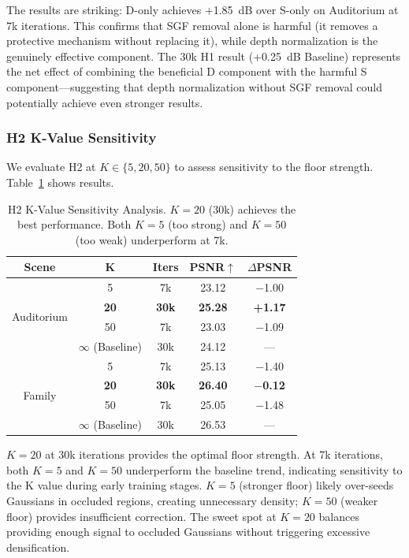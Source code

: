 \documentclass[conference]{IEEEtran}
\begin{document}
The results are striking: D-only achieves +1.85~dB over S-only on Auditorium at 7k iterations. This confirms that SGF removal alone is harmful (it removes a protective mechanism without replacing it), while depth normalization is the genuinely effective component. The 30k H1 result (+0.25~dB Baseline) represents the net effect of combining the beneficial D component with the harmful S component—suggesting that depth normalization without SGF removal could potentially achieve even stronger results.

\subsubsection{H2 K-Value Sensitivity}

We evaluate H2 at $K \in \{5, 20, 50\}$ to assess sensitivity to the floor strength. Table~\ref{tab:k_scan} shows results.

\begin{table}[t]
\centering
\caption{H2 K-Value Sensitivity Analysis. $K=20$ (30k) achieves the best performance. Both $K=5$ (too strong) and $K=50$ (too weak) underperform at 7k.}
\label{tab:k_scan}
\begin{tabular}{ccccc}
\toprule
Scene & K & Iters & PSNR$\uparrow$ & $\Delta$PSNR \\
\midrule
\multirow{4}{*}{Auditorium}
 & 5 & 7k & 23.12 & $-$1.00 \\
 & \textbf{20} & \textbf{30k} & \textbf{25.28} & \textbf{+1.17} \\
 & 50 & 7k & 23.03 & $-$1.09 \\
 & $\infty$ (Baseline) & 30k & 24.12 & — \\
\midrule
\multirow{4}{*}{Family}
 & 5 & 7k & 25.13 & $-$1.40 \\
 & \textbf{20} & \textbf{30k} & \textbf{26.40} & \textbf{$-$0.12} \\
 & 50 & 7k & 25.05 & $-$1.48 \\
 & $\infty$ (Baseline) & 30k & 26.53 & — \\
\bottomrule
\end{tabular}
\end{table}

$K=20$ at 30k iterations provides the optimal floor strength. At 7k iterations, both $K=5$ and $K=50$ underperform the baseline trend, indicating sensitivity to the K value during early training stages. $K=5$ (stronger floor) likely over-seeds Gaussians in occluded regions, creating unnecessary density; $K=50$ (weaker floor) provides insufficient correction. The sweet spot at $K=20$ balances providing enough signal to occluded Gaussians without triggering excessive densification.
\end{document}
